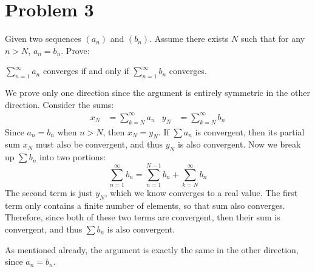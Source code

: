 \documentclass[10pt]{article}
\begin{document}
		\section*{Problem 3} 
		Given two sequences $(a_n)$ and $(b_n)$. Assume there exists $N$ such that for any $n > N$, $a_n = b_n$.
		Prove: 
		
		$\sum_{n = 1}^\infty a_n$ converges if and only if $\sum_{n = 1}^\infty b_n$ converges.

		\begin{solution}
			We prove only one direction since the argument is entirely symmetric in the other direction. Consider
			the sums: 
			\begin{align*}
				x_N &= \sum_{k = N}^\infty a_n & y_N &= \sum_{k = N}^\infty b_n
			\end{align*}
			Since $a_n=b_n$ when $n > N$, then $x_N = y_N$. If $\sum a_n$ is convergent, then its 
			partial sum $x_N$ must also be convergent, and thus $y_N$ is also convergent. Now we break up $\sum
			b_n$ into two portions:
			\[
				\sum_{n = 1}^\infty b_n = \sum_{n=1}^{N-1} b_n + \sum_{k = N}^\infty b_n 
			\] 
			The second term is just $y_N$, which we know converges to a real value. The first term only contains
			a finite number of elements, so that sum also converges. Therefore, since both of these two terms
			are convergent, then their sum is convergent, and thus $\sum b_n$ is also convergent. 

			As mentioned already, the argument is exactly the same in the other direction, since $a_n = b_n$.
		\end{solution}
		\pagebreak
\end{document}
